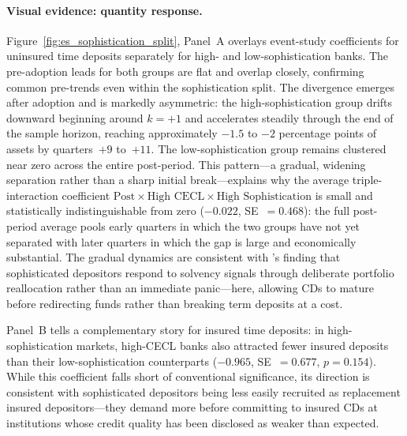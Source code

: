 \paragraph{Visual evidence: quantity response.}
Figure~\ref{fig:es_sophistication_split}, Panel~A overlays event-study
coefficients for uninsured time deposits separately for high- and
low-sophistication banks.  The pre-adoption leads for both groups are flat and
overlap closely, confirming common pre-trends even within the sophistication
split.  The divergence emerges after adoption and is markedly asymmetric: the
high-sophistication group drifts downward beginning around $k=+1$ and accelerates
steadily through the end of the sample horizon, reaching approximately $-1.5$ to
$-2$ percentage points of assets by quarters~$+9$ to~$+11$.  The
low-sophistication group remains clustered near zero across the entire post-period.
This pattern---a gradual, widening separation rather than a sharp initial
break---explains why the average triple-interaction coefficient $\text{Post}
\times \text{High CECL} \times \text{High Sophistication}$ is small and
statistically indistinguishable from zero ($-0.022$, SE~$= 0.468$): the full
post-period average pools early quarters in which the two groups have not yet
separated with later quarters in which the gap is large and economically
substantial.  The gradual dynamics are consistent with \citet{iyer2016tale}'s
finding that sophisticated depositors respond to solvency signals through
deliberate portfolio reallocation rather than an immediate panic---here, allowing
CDs to mature before redirecting funds rather than breaking term deposits at a
cost.

Panel~B tells a complementary story for insured time deposits: in
high-sophistication markets, high-CECL banks also attracted fewer insured deposits
than their low-sophistication counterparts ($-0.965$, SE~$= 0.677$,
$p = 0.154$).  While this coefficient falls short of conventional significance,
its direction is consistent with sophisticated depositors being less easily
recruited as replacement insured depositors---they demand more before committing
to insured CDs at institutions whose credit quality has been disclosed as weaker
than expected.

